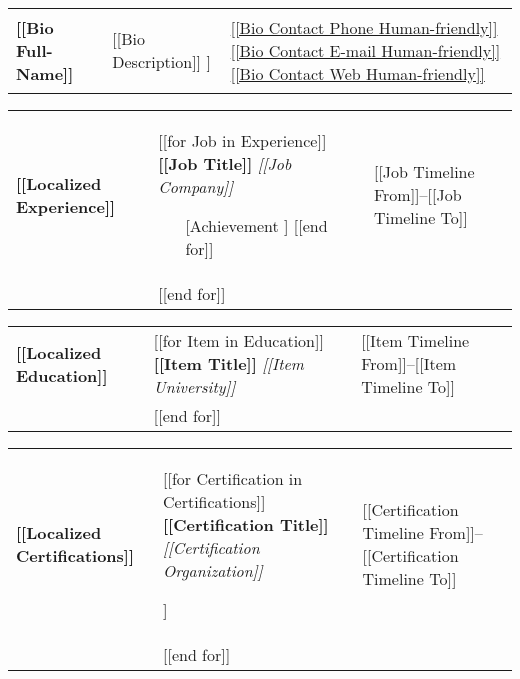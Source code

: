 \documentclass[11pt, a4paper]{article}
\begin{document}
\begin{tabularx}{\textwidth}{m{50mm} m{70mm} m{50mm}}
    \huge\textbf{[[Bio Full-Name]]} \newline &
    \begin{center}
    [[Bio Description]] \newline
    [[Bio Location]] \newline
    \end{center} &
    \small{\hyperlink{[[Bio Contact Phone URI]]}{[[Bio Contact Phone Human-friendly]]}} \newline
    \small{\hyperlink{[[Bio Contact E-mail URI]]}{[[Bio Contact E-mail Human-friendly]]}} \newline
    \small{\hyperlink{[[Bio Contact Web URI]]}{[[Bio Contact Web Human-friendly]]}} \newline
\end{tabularx}

\begin{tabularx}{\textwidth}{p{20mm} p{100mm} p{50mm}}
    \textbf{[[Localized Experience]]} &
    [[for Job in Experience]]
        \textbf{[[Job Title]]} \newline
        \textit{[[Job Company]]}
        \begin{itemize}[leftmargin=*]
        [[for Achievement in Job Achievements]]
            \item [[Achievement]]
        [[end for]]
        \end{itemize} &
        \small{[[Job Timeline From]]--[[Job Timeline To]]} \\ &
    [[end for]]
\end{tabularx}

\begin{tabularx}{\textwidth}{p{20mm} p{100mm} p{50mm}}
    \textbf{[[Localized Education]]} &
    [[for Item in Education]]
        \textbf{[[Item Title]]} \newline
        \textit{[[Item University]]} \newline &
        \small{[[Item Timeline From]]--[[Item Timeline To]]} \\ &
    [[end for]]
\end{tabularx}

\begin{tabularx}{\textwidth}{p{20mm} p{100mm} p{50mm}}
    \textbf{[[Localized Certifications]]} &
    [[for Certification in Certifications]]
        \textbf{[[Certification Title]]} \newline
        \textit{[[Certification Organization]]}
        \begin{flushleft}
        [[Certification Description]]
        \end{flushleft} &
        \small{[[Certification Timeline From]]--[[Certification Timeline To]]} \\ &
    [[end for]]
\end{tabularx}
\end{document}

